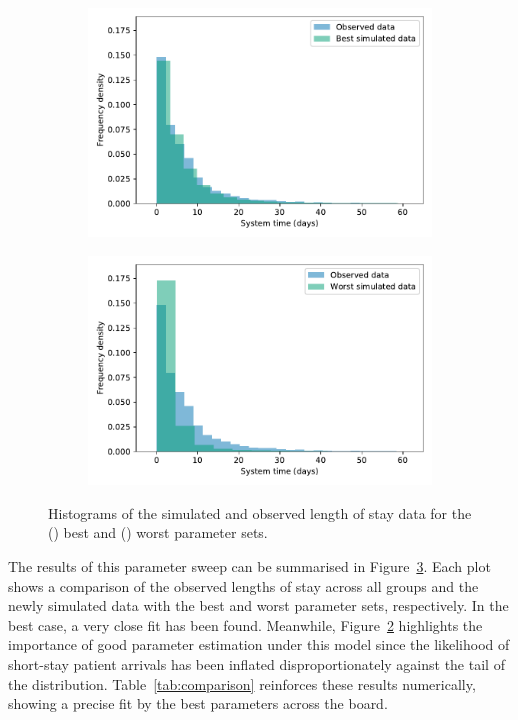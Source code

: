 \begin{figure}
    \centering%
    \begin{subfigure}{.5\imgwidth}
        \includegraphics[width=\linewidth]{best_params}
        \caption{}\label{fig:best_params}
    \end{subfigure}\hfill%
    \begin{subfigure}{.5\imgwidth}
        \includegraphics[width=\linewidth]{worst_params}
        \caption{}\label{fig:worst_params}
    \end{subfigure}
    \caption{Histograms of the simulated and observed length of stay data for
             the () best and ()
             worst parameter sets.}\label{fig:params}
\end{figure}

The results of this parameter sweep can be summarised in
Figure~\ref{fig:params}. Each plot shows a comparison of the observed lengths of
stay across all groups and the newly simulated data with the best and worst
parameter sets, respectively. In the best case, a very close fit has been found.
Meanwhile, Figure~\ref{fig:worst_params} highlights the importance of good
parameter estimation under this model since the likelihood of short-stay patient
arrivals has been inflated disproportionately against the tail of the
distribution. Table~\ref{tab:comparison} reinforces these results numerically,
showing a precise fit by the best parameters across the board.

